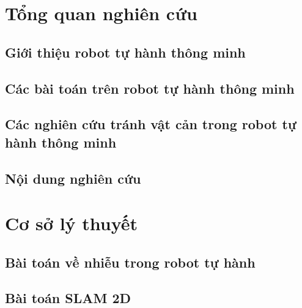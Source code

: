 \chapter{Tổng quan nghiên cứu}
\label{chap:1tqnc}
\section{Giới thiệu robot tự hành thông minh}


\section{Các bài toán trên robot tự hành thông minh}


\section{Các nghiên cứu tránh vật cản trong robot tự hành thông minh}
\label{sec:tranhVatCan_ref}


\section{Nội dung nghiên cứu}


\chapter{Cơ sở lý thuyết}
\label{chap:1cslt}
\section{Bài toán về nhiễu trong robot tự hành}

\section{Bài toán SLAM 2D}

